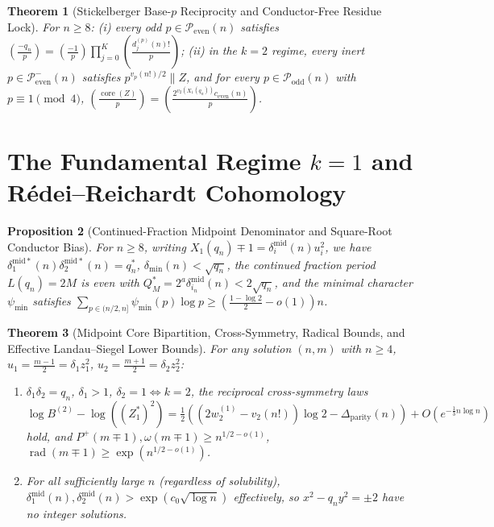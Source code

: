 \documentclass[11pt,reqno]{amsart}
\newtheorem{theorem}{Theorem}[section]
\newtheorem{proposition}[theorem]{Proposition}
\theoremstyle{remark}
\newcommand{\Podd}{\mathcal{P}_{\mathrm{odd}}}
\newcommand{\Peven}{\mathcal{P}_{\mathrm{even}}}
\newcommand{\core}{\operatorname{core}}
\newcommand{\rad}{\operatorname{rad}}
\begin{document}
\begin{theorem}[Stickelberger Base-$p$ Reciprocity and Conductor-Free Residue Lock]\label{thm:4.4}
For $n \ge 8$: (i) every odd $p \in \Peven(n)$ satisfies $(\frac{-q_n}{p}) = (\frac{-1}{p})\prod_{j=0}^K (\frac{d_j^{(p)}(n)!}{p})$; (ii) in the $k = 2$ regime, every inert $p \in \Peven^-(n)$ satisfies $p^{v_p(n!)/2} \parallel Z$, and for every $p \in \Podd(n)$ with $p \equiv 1 \pmod 4$, $(\frac{\core(Z)}{p}) = (\frac{2^{v_2(X_1(q_n))} c_{\mathrm{even}}(n)}{p})$.
\end{theorem}

\section{The Fundamental Regime $k = 1$ and R\'edei--Reichardt Cohomology}

\begin{proposition}[Continued-Fraction Midpoint Denominator and Square-Root Conductor Bias]\label{prop:5.1}
For $n \ge 8$, writing $X_1(q_n) \mp 1 = \delta_i^{\mathrm{mid}}(n) u_i^2$, we have $\delta_1^{\mathrm{mid}*}(n)\delta_2^{\mathrm{mid}*}(n) = q_n^*$, $\delta_{\min}(n) < \sqrt{q_n}$, the continued fraction period $L(q_n) = 2M$ is even with $Q^*_M = 2^a \delta_{i_n}^{\mathrm{mid}}(n) < 2\sqrt{q_n}$, and the minimal character $\psi_{\min}$ satisfies $\sum_{p \in (n/2, n]} \psi_{\min}(p)\log p \ge (\frac{1-\log 2}{2} - o(1))n$.
\end{proposition}

\begin{theorem}[Midpoint Core Bipartition, Cross-Symmetry, Radical Bounds, and Effective Landau--Siegel Lower Bounds]\label{thm:5.2}
For any solution $(n, m)$ with $n \ge 4$, $u_1 = \frac{m-1}{2} = \delta_1 z_1^2$, $u_2 = \frac{m+1}{2} = \delta_2 z_2^2$:
\begin{enumerate}
\item[(i)] $\delta_1\delta_2 = q_n$, $\delta_1 > 1$, $\delta_2 = 1 \iff k = 2$, the reciprocal cross-symmetry laws $\log B^{(2)} - \log((Z_1^*)^2) = \frac{1}{2}((2w_2^{(1)} - v_2(n!))\log 2 - \Delta_{\mathrm{parity}}(n)) + O(e^{-\frac{1}{3}n\log n})$ hold, and $P^+(m \mp 1), \omega(m \mp 1) \ge n^{1/2-o(1)}$, $\rad(m \mp 1) \ge \exp(n^{1/2-o(1)})$.
\item[(ii)] For all sufficiently large $n$ (regardless of solubility), $\delta_1^{\mathrm{mid}}(n), \delta_2^{\mathrm{mid}}(n) > \exp(c_0\sqrt{\log n})$ effectively, so $x^2 - q_n y^2 = \pm 2$ have no integer solutions.
\end{enumerate}
\end{theorem}
\end{document}
